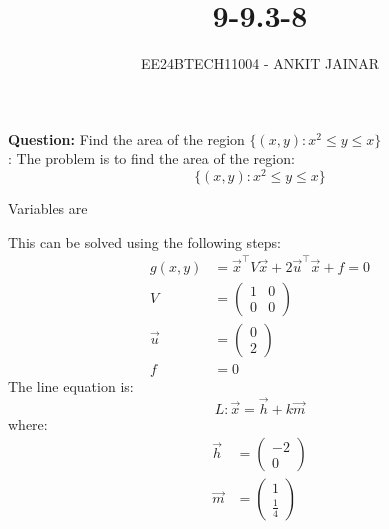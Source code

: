 \documentclass[journal]{IEEEtran}
\begin{document}

\vspace{3cm}


\title{9-9.3-8}
\author{EE24BTECH11004 - ANKIT JAINAR
}
{\let\newpage\relax\maketitle}

\renewcommand{\thefigure}{\theenumi}
\renewcommand{\thetable}{\theenumi}
\setlength{\intextsep}{10pt} %


\renewcommand{\thetable}{\theenumi}

\textbf{Question:} Find the area of the region $\{(x, y) : x^2 \leq y \leq x \}$ \\
\solution: The problem is to find the area of the region:
\[
\{(x, y) : x^2 \leq y \leq x \}
\]
\begin{table}[h!]    
  \centering
  
  \caption{Variables are}
  \label{tab 3.2.15}
\end{table}
This can be solved using the following steps:
\begin{align}
    g(x, y) &= \vec{x}^\top V \vec{x} + 2\vec{u}^\top \vec{x} + f = 0 \\
    V &= \begin{pmatrix} 1 & 0 \\ 0 & 0 \end{pmatrix} \\
    \vec{u} &= \begin{pmatrix} 0 \\ 2 \end{pmatrix} \\
    f &= 0
\end{align}
The line equation is:
\[
L: \vec{x} = \vec{h} + k \vec{m}
\]
where:
\begin{align}
    \vec{h} &= \begin{pmatrix} -2 \\ 0 \end{pmatrix} \\
    \vec{m} &= \begin{pmatrix} 1 \\ \frac{1}{4} \end{pmatrix}
\end{align}
\end{document}
